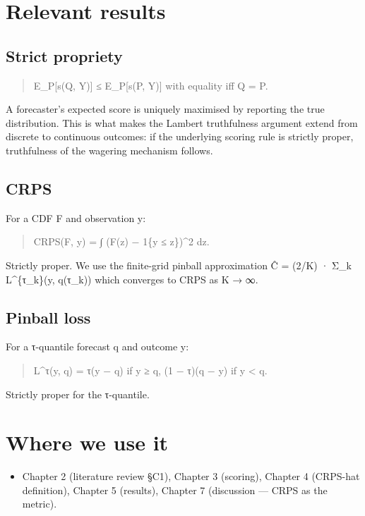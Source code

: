 \documentclass[11pt,a4paper,openany]{report}
\begin{document}
\section{Relevant results}

\subsection{Strict propriety}

\begin{quote}
E\_P[s(Q, Y)] ≤ E\_P[s(P, Y)] with equality iff Q = P.

\end{quote}
A forecaster's expected score is uniquely maximised by reporting the
true distribution. This is what makes the Lambert truthfulness
argument extend from discrete to continuous outcomes: if the
underlying scoring rule is strictly proper, truthfulness of the
wagering mechanism follows.

\subsection{CRPS}

For a CDF F and observation y:

\begin{quote}
CRPS(F, y) = ∫ (F(z) − 1\{y ≤ z\})\textasciicircum{}2 dz.

\end{quote}
Strictly proper. We use the finite-grid pinball approximation
Ĉ = (2/K) · Σ\_k L\textasciicircum{}\{τ\_k\}(y, q(τ\_k)) which converges to CRPS as K → ∞.

\subsection{Pinball loss}

For a τ-quantile forecast q and outcome y:

\begin{quote}
L\textasciicircum{}τ(y, q) = τ(y − q) if y ≥ q, (1 − τ)(q − y) if y < q.

\end{quote}
Strictly proper for the τ-quantile.

\section{Where we use it}

\begin{itemize}
  \item Chapter 2 (literature review §C1), Chapter 3 (scoring),
    Chapter 4 (CRPS-hat definition), Chapter 5 (results), Chapter 7
    (discussion — CRPS as the metric).
\end{itemize}
\end{document}
